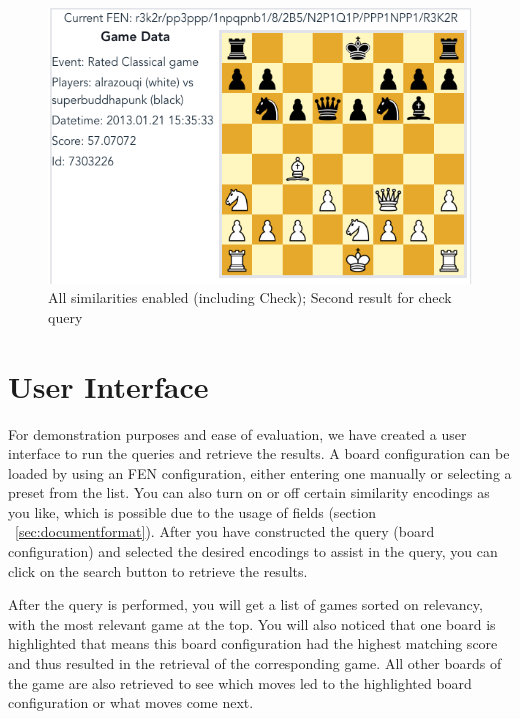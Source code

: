 \documentclass[11pt]{article}
\begin{document}
    \begin{figure}[H]
        \centering
        \includegraphics[width=12cm]{images/BlackCheck2-BoReAtDeCh}
        \caption{All similarities enabled (including Check); Second result for check query}
        \label{fig:BlackCheck2-BoReAtDeCh}
    \end{figure}




    \section{User Interface}

    For demonstration purposes and ease of evaluation, we have created a user interface to run the queries and retrieve the results. A board configuration can be loaded by using an FEN configuration, either entering one manually or selecting a preset from the list. You can also turn on or off certain similarity encodings as you like, which is possible due to the usage of fields (section ~\ref{sec:documentformat}). After you have constructed the query (board configuration) and selected the desired encodings to assist in the query, you can click on the search button to retrieve the results.

    After the query is performed, you will get a list of games sorted on relevancy, with the most relevant game at the top. You will also noticed that one board is highlighted that means this board configuration had the highest matching score and thus resulted in the retrieval of the corresponding game. All other boards of the game are also retrieved to see which moves led to the highlighted board configuration or what moves come next.
\end{document}
